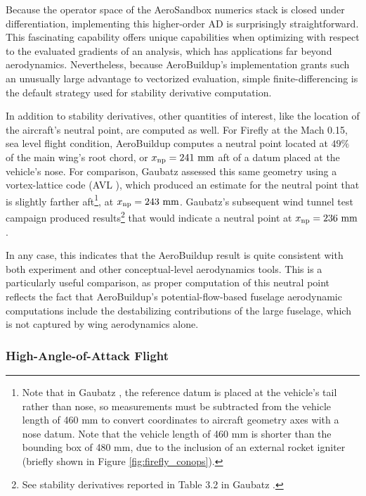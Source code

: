 Because the operator space of the AeroSandbox numerics stack is closed under differentiation, implementing this higher-order AD is surprisingly straightforward. This fascinating capability offers unique capabilities when optimizing with respect to the evaluated gradients of an analysis, which has applications far beyond aerodynamics. Nevertheless, because AeroBuildup's implementation grants such an unusually large advantage to vectorized evaluation, simple finite-differencing is the default strategy used for stability derivative computation.

In addition to stability derivatives, other quantities of interest, like the location of the aircraft's neutral point, are computed as well. For Firefly at the Mach 0.15, sea level flight condition, AeroBuildup computes a neutral point located at $49\%$ of the main wing's root chord, or $x_{\rm np} = 241\ \rm mm$ aft of a datum placed at the vehicle's nose. For comparison, Gaubatz \cite{gaubatz_design_2024} assessed this same geometry using a vortex-lattice code (AVL \cite{avl}), which produced an estimate for the neutral point that is slightly farther aft\footnote{Note that in Gaubatz \cite{gaubatz_design_2024}, the reference datum is placed at the vehicle's tail rather than nose, so measurements must be subtracted from the vehicle length of 460 mm to convert coordinates to aircraft geometry axes with a nose datum. Note that the vehicle length of 460 mm is shorter than the bounding box of 480 mm, due to the inclusion of an external rocket igniter (briefly shown in Figure \ref{fig:firefly_conops}).}, at $x_{\rm np} = 243\ \rm mm$. Gaubatz's subsequent wind tunnel test campaign produced results\footnote{See stability derivatives reported in Table 3.2 in Gaubatz \cite{gaubatz_design_2024}.} that would indicate a neutral point at $x_{\rm np} = 236\ \rm mm$.

In any case, this indicates that the AeroBuildup result is quite consistent with both experiment and other conceptual-level aerodynamics tools. This is a particularly useful comparison, as proper computation of this neutral point reflects the fact that AeroBuildup's potential-flow-based fuselage aerodynamic computations include the destabilizing contributions of the large fuselage, which is not captured by wing aerodynamics alone.

\subsubsection{High-Angle-of-Attack Flight}

